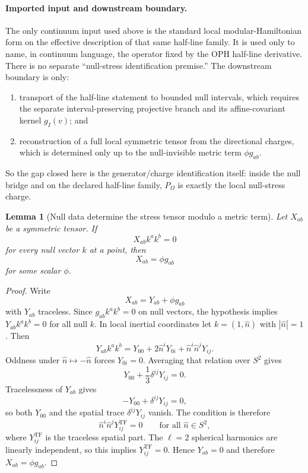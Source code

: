 \documentclass[11pt]{article}
\newtheorem{lemma}[theorem]{Lemma}
\begin{document}
\paragraph{Imported input and downstream boundary.}
The only continuum input used above is the standard local modular-Hamiltonian form on the effective description of that same half-line family. It is used only to name, in continuum language, the operator fixed by the OPH half-line derivative. There is no separate ``null-stress identification premise.'' The downstream boundary is only:
\begin{enumerate}[label=(\roman*),leftmargin=2.2em]
\item transport of the half-line statement to bounded null intervals, which requires the separate interval-preserving projective branch and its affine-covariant kernel \(g_I(v)\); and
\item reconstruction of a full local symmetric tensor from the directional charges, which is determined only up to the null-invisible metric term \(\phi g_{ab}\).
\end{enumerate}
So the gap closed here is the generator/charge identification itself: inside the null bridge and on the declared half-line family, \(P_\Omega\) is exactly the local null-stress charge.

\begin{lemma}[Null data determine the stress tensor modulo a metric term]\label{lem:nullreconstruct}
Let \(X_{ab}\) be a symmetric tensor. If
\[
X_{ab}k^ak^b=0
\]
for every null vector \(k\) at a point, then
\[
X_{ab}=\phi g_{ab}
\]
for some scalar \(\phi\).
\end{lemma}

\begin{proof}
Write
\[
X_{ab}=Y_{ab}+\phi g_{ab}
\]
with \(Y_{ab}\) traceless. Since \(g_{ab}k^ak^b=0\) on null vectors, the hypothesis implies \(Y_{ab}k^ak^b=0\) for all null \(k\). In local inertial coordinates let \(k=(1,\hat n)\) with \(|\hat n|=1\). Then
\[
Y_{ab}k^ak^b
=
Y_{00}+2\hat n^iY_{0i}+\hat n^i\hat n^jY_{ij}.
\]
Oddness under \(\hat n\mapsto-\hat n\) forces \(Y_{0i}=0\). Averaging that relation over \(S^2\) gives
\[
Y_{00}+\frac13\delta^{ij}Y_{ij}=0.
\]
Tracelessness of \(Y_{ab}\) gives
\[
-Y_{00}+\delta^{ij}Y_{ij}=0,
\]
so both \(Y_{00}\) and the spatial trace \(\delta^{ij}Y_{ij}\) vanish. The condition is therefore
\[
\hat n^i\hat n^j Y_{ij}^{\mathrm{TF}}=0
\qquad
\text{for all }\hat n\in S^2,
\]
where \(Y_{ij}^{\mathrm{TF}}\) is the traceless spatial part. The \(\ell=2\) spherical harmonics are linearly independent, so this implies \(Y_{ij}^{\mathrm{TF}}=0\). Hence \(Y_{ab}=0\) and therefore \(X_{ab}=\phi g_{ab}\).
\end{proof}
\end{document}
